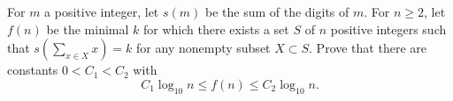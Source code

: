 For $m$ a positive integer, let $s(m)$ be the sum of the digits of $m$. For $n\ge 2$,  let $f(n)$ be the minimal $k$ for which there  exists a set $S$ of $n$ positive integers such that  $s\left(\sum_{x\in X} x\right)=k$ for any nonempty subset $X\subset S$.  Prove that there are constants $0<C_1<C_2$ with\[C_1 \log_{10} n \le f(n) \le C_2 \log_{10} n.\]